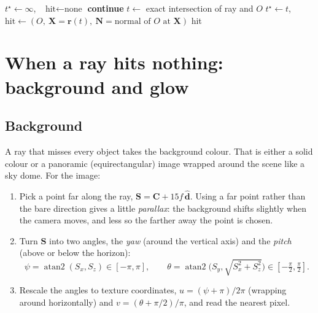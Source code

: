 \documentclass[11pt,a4paper]{article}
\newcommand{\vv}[1]{\mathbf{#1}}
\newcommand{\unit}[1]{\widehat{#1}}
\begin{document}
\begin{algorithm}[h]
\caption{Nearest intersection}
\begin{algorithmic}[1]
  \State $t^\star\gets\infty$, \ $\text{hit}\gets\text{none}$
     \textbf{continue} \EndIf
    \State $t \gets$ exact intersection of ray and $O$
       \State $t^\star\gets t$, \ $\text{hit}\gets (O,\ \vv X=\vv r(t),\ \vv N = \text{normal of } O \text{ at } \vv X)$
    \EndIf
  \EndFor
  \State \Return hit
\EndFunction
\end{algorithmic}
\end{algorithm}

\section{When a ray hits nothing: background and glow}

\subsection{Background}

A ray that misses every object takes the background colour. That is either a
solid colour or a panoramic (equirectangular) image wrapped around the scene like
a sky dome. For the image:

\begin{enumerate}[leftmargin=1.6em]
  \item Pick a point far along the ray, $\vv S = \vv C + 15f\,\unit{\vv d}$. Using
        a far point rather than the bare direction gives a little
        \emph{parallax}: the background shifts slightly when the camera moves,
        and less so the farther away the point is chosen.
  \item Turn $\vv S$ into two angles, the \emph{yaw} (around the vertical axis)
        and the \emph{pitch} (above or below the horizon):
        \[
          \psi = \operatorname{atan2}(S_x, S_z)\in[-\pi,\pi],\qquad
          \theta = \operatorname{atan2}\big(S_y,\sqrt{S_x^2+S_z^2}\big)\in[-\tfrac\pi2,\tfrac\pi2].
        \]
  \item Rescale the angles to texture coordinates,
        $u = (\psi+\pi)/2\pi$ (wrapping around horizontally) and
        $v = (\theta+\pi/2)/\pi$, and read the nearest pixel.
\end{enumerate}
\end{document}
